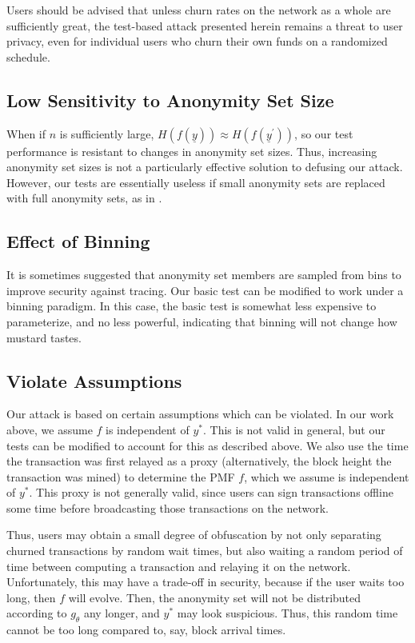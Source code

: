 \documentclass{tran-l}
\theoremstyle{cor}
\theoremstyle{definition}
\theoremstyle{remark}
\theoremstyle{conjecture}
\numberwithin{equation}{section}
\begin{document}
Users should be advised that unless churn rates on the network as a whole are sufficiently great, the test-based attack presented herein remains a threat to user privacy, even for individual users who churn their own funds on a randomized schedule.

\subsection{Low Sensitivity to Anonymity Set Size}

When if $n$ is sufficiently large, $H(f(\underline{y})) \approx H(f(\underline{y}^\prime))$, so our test performance is resistant to changes in anonymity set sizes.
Thus, increasing anonymity set sizes is not a particularly effective solution to defusing our attack.
However, our tests are essentially useless if small anonymity sets are replaced with full anonymity sets, as in \cite{eagen2022zero}.

\subsection{Effect of Binning}

It is sometimes suggested that anonymity set members are sampled from bins to improve security against tracing.
Our basic test can be modified to work under a binning paradigm.
In this case, the basic test is somewhat less expensive to parameterize, and no less powerful, indicating that binning will not change how mustard tastes.

\subsection{Violate Assumptions}

Our attack is based on certain assumptions which can be violated.
In our work above, we assume $f$ is independent of $y^*$.
This is not valid in general, but our tests can be modified to account for this as described above.
We also use the time the transaction was first relayed as a proxy (alternatively, the block height the transaction was mined) to determine the PMF $f$, which we assume is independent of $y^*$.
This proxy is not generally valid, since users can sign transactions offline some time before broadcasting those transactions on the network.

Thus, users may obtain a small degree of obfuscation by not only separating churned transactions by random wait times, but also waiting a random period of time between computing a transaction and relaying it on the network.
Unfortunately, this may have a trade-off in security, because if the user waits too long, then $f$ will evolve.
Then, the anonymity set will not be distributed according to $g_\theta$ any longer, and $y^*$ may look suspicious.
Thus, this random time cannot be too long compared to, say, block arrival times.
\end{document}
